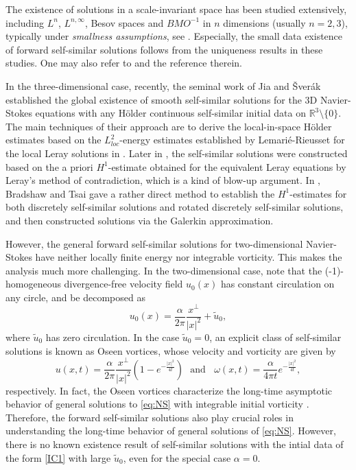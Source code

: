 \documentclass[12pt]{amsart}
\numberwithin{equation}{section}              %
\theoremstyle{remark}
\begin{document}
The existence of solutions  in a scale-invariant space has been studied extensively, including $L^{n}$, $L^{n,\infty}$, Besov spaces and $BMO^{-1}$ in $n$ dimensions (usually $n=2,3$), typically under \emph{smallness assumptions}, see \cite{Barraza96, Cannone96, Giga89, Koch01}. Especially, the small data existence of forward self-similar solutions follows from the uniqueness results in these studies.
	One may also refer to \cite[Chapter 8]{Tsai18} and the reference therein. 

In the three-dimensional case,	
	recently, the seminal work of Jia and {\v{S}}ver{\'{a}}k \cite{Jia14} established the global existence of smooth self-similar solutions for the 3D Navier-Stokes equations with any Hölder continuous self-similar initial data on $\mathbb{R}^{3} \setminus \{0\}$. The main techniques of their approach are to derive  the local-in-space
	H\"older estimates based on the $L_{loc}^{2}$-energy estimates established
	by Lemari\'{e}-Rieusset for the local Leray solutions in \cite{Lemarie02}.  Later in 
	\cite{Korobkov2016}, the self-similar solutions  were constructed
	based on the a priori $H^1$-estimate obtained for  the equivalent Leray equations
	by Leray’s method of contradiction, which is a kind of blow-up argument. In
	\cite{Tsai17, Bradshaw17}, Bradshaw and Tsai
	gave a rather direct method to establish the $H^1$-estimates for both discretely self-similar solutions and rotated discretely self-similar solutions, and then constructed   solutions  via the  Galerkin approximation.
	 
	
	

However, the general forward self-similar solutions for two-dimensional Navier-Stokes have neither locally finite energy nor integrable vorticity. This makes the analysis much more challenging.
In the two-dimensional case,			note that the (-1)-homogeneous divergence-free velocity field  $u_0(x)$ has constant circulation on any circle, and be decomposed  as 
	\begin{equation}\label{IC1}
		u_0(x) = \frac{\alpha}{2\pi} \frac{x^\perp}{|x|^2}   +\tilde{u}_0,
	\end{equation}
	where $\tilde{u}_0$ has zero circulation.
In the case $\tilde{u}_0=0$, an explicit class of self-similar solutions is known as Oseen vortices,  whose velocity and vorticity are given by 
	\begin{equation*}
		u(x,t) = \frac{\alpha}{2\pi}  \frac{x^\perp}{|x|^2}(1-e^{-\frac{|x|^2}{4t}}) \,\,\text{ and }\,\, ~\omega (x,t) = \frac{\alpha}{4\pi t} e^{-\frac{|x|^2}{4t}},
	\end{equation*}
    respectively.
	In fact, the  
	Oseen vortices characterize the long-time asymptotic behavior of general solutions to \eqref{eq:NS} with integrable initial vorticity \cite{Gallay05, Giga88, Carpio94}. Therefore, the forward self-similar solutions also play crucial roles in understanding the long-time behavior of general solutions of  \eqref{eq:NS}. 
	However, there is no known existence result of self-similar solutions with the intial data of the form \eqref{IC1} with large $\tilde{u}_0$, even for the special case $\alpha=0$.
\end{document}

